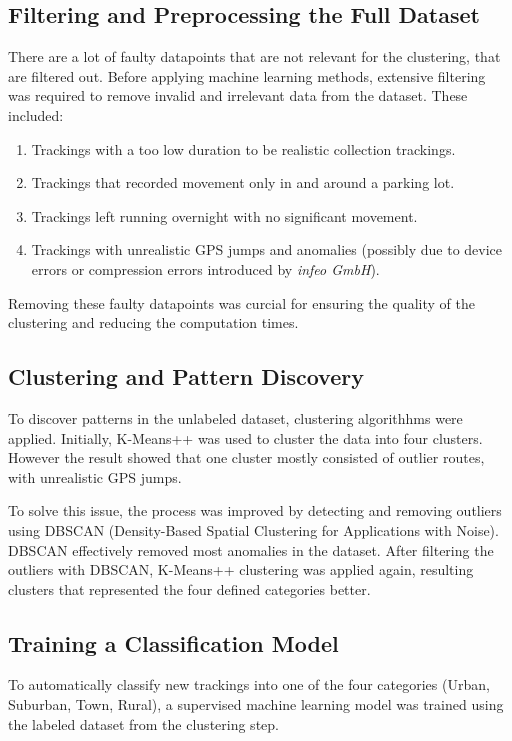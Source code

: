 \documentclass[a4paper,12pt,twoside]{scrreprt}
\begin{document}
\subsection{Filtering and Preprocessing the Full Dataset}
There are a lot of faulty datapoints that are not relevant for the
clustering, that are filtered out. Before applying machine learning methods,
extensive filtering was required to
remove invalid and irrelevant data from the dataset. These included:

\begin{enumerate}
  \item Trackings with a too low duration to be realistic collection trackings.

  \item Trackings that recorded movement only in and around a parking lot.
  \item Trackings left running overnight with no significant movement.
  \item Trackings with unrealistic GPS jumps and anomalies (possibly due to
        device errors or compression errors introduced by \textit{infeo GmbH}).
\end{enumerate}

Removing these faulty datapoints was curcial for ensuring the quality of the
clustering and reducing the computation times.

\subsection{Clustering and Pattern Discovery}
To discover patterns in the unlabeled dataset, clustering algorithhms were
applied.
Initially, K-Means++ was used to cluster the data into four clusters. However
the result showed that one cluster mostly consisted of outlier routes, with
unrealistic GPS jumps.

To solve this issue, the process was improved by detecting and removing
outliers using DBSCAN (Density-Based Spatial Clustering for Applications with
Noise). DBSCAN effectively removed most anomalies in the dataset. After
filtering the outliers with DBSCAN, K-Means++ clustering was applied again,
resulting clusters that represented the four defined categories better.

\subsection{Training a Classification Model}
To automatically classify new trackings into one of the four categories (Urban,
Suburban, Town, Rural), a supervised machine learning model was trained using
the labeled dataset from the clustering step.
\end{document}
